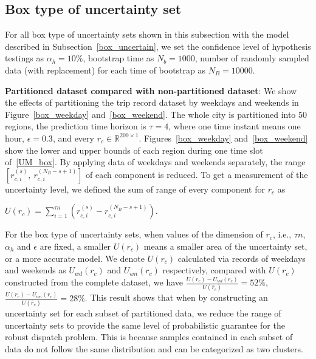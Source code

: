 \documentclass[10pt,twocolumn,twoside,english]{IEEEtran}
\begin{document}
\subsection{Box type of uncertainty set}
For all box type of uncertainty sets shown in this subsection with the model described in Subsection~\ref{box_uncertain}, we set the confidence level of hypothesis testings as $\alpha_h=10\%$, bootstrap time as $N_b=1000$, number of randomly sampled data (with replacement) for each time of bootstrap as $N_B=10000$.

\textbf{Partitioned dataset compared with non-partitioned dataset}:
We show the effects of partitioning the trip record dataset by weekdays and weekends in Figure~\ref{box_weekday} and~\ref{box_weekend}. The whole city is partitioned into $50$ regions, the prediction time horizon is $\tau =4$, where one time instant means one hour, $\epsilon=0.3$, and every $r_c \in \mathbb{R}^{200 \times 1}$.  Figures~\ref{box_weekday} and~\ref{box_weekend} show the lower and upper bounds of each region during one time slot of~\eqref{UM_box}.  By applying data of weekdays and weekends separately, the range $[r_{c,i}^{(s)},\ r_{c,i}^{(N_B-s+1)}]$ of each component is reduced. To get a measurement of the uncertainty level, we defined the sum of range of every component for $r_c$  as\\
\centerline{$U (r_c)= \sum\limits_{i=1}^{\tau n}(r_{c,i}^{(s)}-r_{c,i}^{(N_B -s+1)})$.}
For the box type of uncertainty sets, when values of the dimension of $r_c$, i.e., $\tau n$, $\alpha_h$ and $\epsilon$ are fixed, a smaller $U(r_c)$ means a smaller area of the uncertainty set, or a more accurate model. We denote $U(r_c)$ calculated via records of weekdays and weekends as $U_{wd}(r_c)$ and $U_{wn}(r_c)$ respectively, compared with $U(r_c)$ constructed from the complete dataset, we have $\frac{U(r_c)-U_{wd}({r}_c)}{U(\hat{r}_c)}=52\%$, $\frac{U({r}_c)-U_{wn}({r}_c)}{U(\hat{r}_c)}=28\%.$ This result shows that when by constructing an uncertainty set for each subset of partitioned data, we reduce the range of uncertainty sets to provide the same level of probabilistic guarantee for the robust dispatch problem. This is because samples contained in each subset of data do not follow the same distribution and can be categorized as two clusters. 
\end{document}
